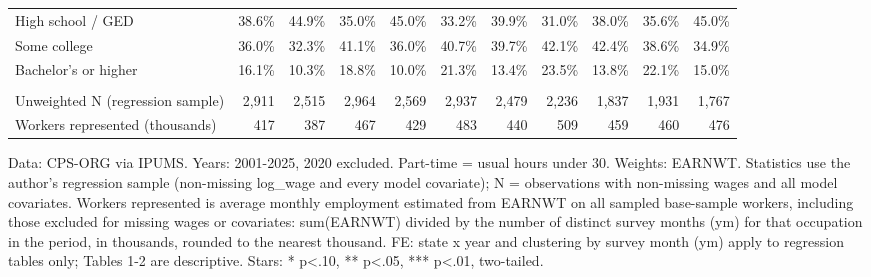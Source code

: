 \begin{table}[!t]
\begin{tabular}{l|rrrrrrrrrr}
High school / GED & 38.6\% & 44.9\% & 35.0\% & 45.0\% & 33.2\% & 39.9\% & 31.0\% & 38.0\% & 35.6\% & 45.0\% \\
Some college & 36.0\% & 32.3\% & 41.1\% & 36.0\% & 40.7\% & 39.7\% & 42.1\% & 42.4\% & 38.6\% & 34.9\% \\
Bachelor's or higher & 16.1\% & 10.3\% & 18.8\% & 10.0\% & 21.3\% & 13.4\% & 23.5\% & 13.8\% & 22.1\% & 15.0\% \\
\midrule\addlinespace[2.5pt]
\multicolumn{11}{l}{Sample} \\[2.5pt] 
\midrule\addlinespace[2.5pt]
Unweighted N (regression sample) & 2,911 & 2,515 & 2,964 & 2,569 & 2,937 & 2,479 & 2,236 & 1,837 & 1,931 & 1,767 \\
Workers represented (thousands) & 417 & 387 & 467 & 429 & 483 & 440 & 509 & 459 & 460 & 476 \\
\bottomrule
\end{tabular}\par\raggedright
\begin{minipage}{\linewidth}
Data: CPS-ORG via IPUMS. Years: 2001-2025, 2020 excluded. Part-time = usual hours under 30. Weights: EARNWT. Statistics use the author's regression sample (non-missing log\_wage and every model covariate); N = observations with non-missing wages and all model covariates. Workers represented is average monthly employment estimated from EARNWT on all sampled base-sample workers, including those excluded for missing wages or covariates: sum(EARNWT) divided by the number of distinct survey months (ym) for that occupation in the period, in thousands, rounded to the nearest thousand. FE: state x year and clustering by survey month (ym) apply to regression tables only; Tables 1-2 are descriptive. Stars: * p<.10, ** p<.05, *** p<.01, two-tailed.\\
\end{minipage}
\end{table}
